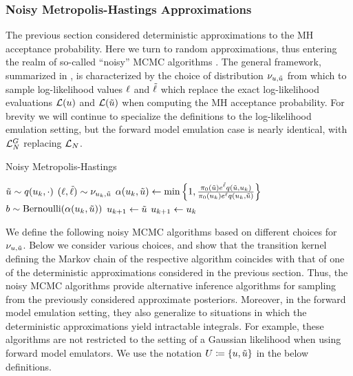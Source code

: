 \documentclass[12pt]{article}
\begin{document}
\subsubsection{Noisy Metropolis-Hastings Approximations}
The previous section considered deterministic approximations to the MH acceptance probability. Here we turn 
to random approximations, thus entering the realm of so-called ``noisy'' MCMC algorithms 
\cite{noisyMCMC, stabilityNoisyMH, noisyMCSurvey, pseudoMarginalMCMC}. The general framework,
summarized in , is characterized by the choice of distribution $\llikSampDist_{\Par, \propPar}$
from which to sample log-likelihood values $\llikSamp$ and $\llikSampProp$ which replace the exact 
log-likelihood evaluations $\llik(\Par)$ and $\llik(\propPar)$ when computing the MH acceptance probability. 
For brevity we will continue to specialize the definitions to the log-likelihood emulation setting, but the forward model 
emulation case is nearly identical, with $\llikEmFwd$ replacing $\llikEm$. 

\begin{algorithm}
    \caption{Noisy Metropolis-Hastings}
    \label{alg:noisy-MH}
    \begin{algorithmic}[1] %
        		\State $\propPar \sim \propDens(\indexMCMC{\Par}, \cdot)$ 
		\State $(\llikSamp, \llikSampProp) \sim \llikSampDist_{\indexMCMC{\Par}, \propPar}$  
		\State $\accProbMH(\indexMCMC{\Par}, \propPar) \gets \min\left\{1, \frac{\priorDens(\propPar)e^{\llikSampProp} 
				\propDens(\propPar, \indexMCMC{\Par})}{\priorDens(\indexMCMC{\Par}) e^{\llikSamp}  \propDens(\indexMCMC{\Par}, \propPar)} \right\}$
		\State $b \sim \text{Bernoulli}(\accProbMH(\indexMCMC{\Par}, \propPar))$
			\State $\indexMCMC[\mcmcIndex+1]{\Par} \gets \propPar$ 
		\Else
			\State $\indexMCMC[\mcmcIndex+1]{\Par} \gets \indexMCMC{\Par}$
		\EndIf
	\EndFor
	\EndFunction
    \end{algorithmic}
\end{algorithm}

We define the following noisy MCMC algorithms based on different choices for $\llikSampDist_{\Par, \propPar}$.
Below we consider various choices, and show that the transition kernel defining the Markov chain of the 
respective algorithm coincides with that of one of the deterministic approximations considered in the previous 
section. Thus, the noisy MCMC algorithms provide alternative inference algorithms for sampling from the previously 
considered approximate posteriors. Moreover, in the forward model emulation setting, they also generalize to 
situations in which the deterministic approximations yield intractable integrals. For example, these algorithms are 
not restricted to the setting of a Gaussian likelihood when using forward model emulators. 
We use the notation $\parMat \Def \{\Par, \propPar\}$ in the below definitions. 
\end{document}
